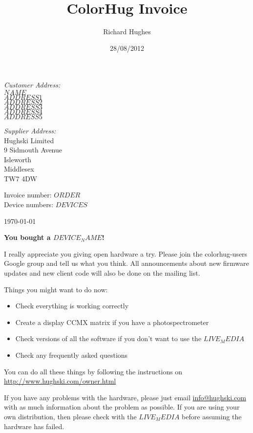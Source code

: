 \documentclass[a4paper,10pt,oneside]{letter}
\author{Richard Hughes}
\title{ColorHug Invoice}
\date{28/08/2012}
\begin{document}
\large
\renewcommand{\arraystretch}{1.5}

\begin{minipage}[t]{4in}
\textit{Customer Address:}\\
$NAME$\\
$ADDRESS1$\\
$ADDRESS2$\\
$ADDRESS3$\\
$ADDRESS4$\\
$ADDRESS5$\\
\end{minipage}
\begin{minipage}[t]{2in}
\textit{Supplier Address:}\\
Hughski Limited\\
9 Sidmouth Avenue\\
Isleworth\\
Middlesex\\
TW7 4DW
\end{minipage}

Invoice number: \texttt{$ORDER$}\\
Device numbers: \texttt{$DEVICES$}

\begin{flushright}
 \today
\end{flushright}

\textbf{You bought a $DEVICE_NAME$!}

I really appreciate you giving open hardware a try. Please join the colorhug-users Google group and tell us what you think. All announcements about new firmware updates and new client code will also be done on the mailing list.

Things you might want to do now:

\begin{itemize}
\item Check everything is working correctly
\item Create a display CCMX matrix if you have a photospectrometer
\item Check versions of all the software if you don't want to use the $LIVE_MEDIA$
\item Check any frequently asked questions
\end{itemize}

You can do all these things by following the instructions on \\\url{http://www.hughski.com/owner.html}

If you have any problems with the hardware, please just email \url{info@hughski.com} with as much information about the problem as possible. If you are using your own distribution, then please check with the $LIVE_MEDIA$ before assuming the hardware has failed.
\end{document}
